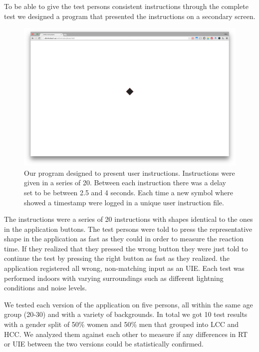 \documentclass[runningheads,a4paper]{llncs}
\begin{document}
To be able to give the test persons consistent instructions through the complete test we designed a program that presented the instructions on a secondary screen. 
\begin{figure}
	\centering
	\includegraphics[width=\textwidth]{instructions}
	\caption{Our program designed to present user instructions. Instructions were given in a series of 20. Between each instruction there was a delay set to be between 2.5 and 4 seconds. Each time a new symbol where showed a timestamp were logged in a unique user instruction file.
	\label{fig:instructions}}
\end{figure}
The instructions were a series of 20 instructions with shapes identical to the ones in the application buttons. The test persons were told to press the representative shape in the application as fast as they could in order to measure the reaction time. If they realized that they pressed the wrong button they were just told to continue the test by pressing the right button as fast as they realized. the application registered all wrong, non-matching input as an UIE. Each test was performed indoors with varying surroundings such as different lightning conditions and noise levels. 

We tested each version of the application on five persons, all within the same age group (20-30) and with a variety of backgrounds. In total we got 10 test results with a gender split of 50\% women and 50\% men that grouped into LCC and HCC. We analyzed them against each other to measure if any differences in RT or UIE between the two versions could be statistically confirmed.
\end{document}
